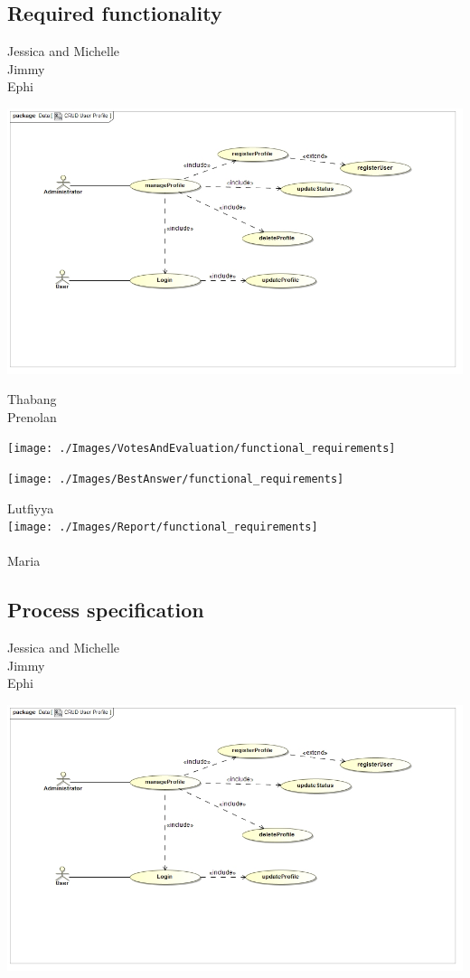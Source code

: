 \documentclass[a4paper,11pt]{article}
\begin{document}
\subsection{Required functionality}
Jessica and Michelle\\
Jimmy\\
Ephi\\
\begin{center}
\includegraphics[width=0.9\linewidth]{./Images/ManageUserProfile/functional_requirements}
\end{center}
Thabang\\
Prenolan\\
\begin{center}
\texttt{[image: ./Images/VotesAndEvaluation/functional\_requirements]}
\end{center}

\begin{center}
\texttt{[image: ./Images/BestAnswer/functional\_requirements]}
\end{center}

Lutfiyya\\
\texttt{[image: ./Images/Report/functional\_requirements]}\\
\\

Maria\\

\subsection{Process specification}
Jessica and Michelle\\
Jimmy\\
Ephi\\

\begin{center}
\includegraphics[width=0.9\linewidth]{./Images/ManageUserProfile/functional_requirements}
\end{center}
\end{document}

